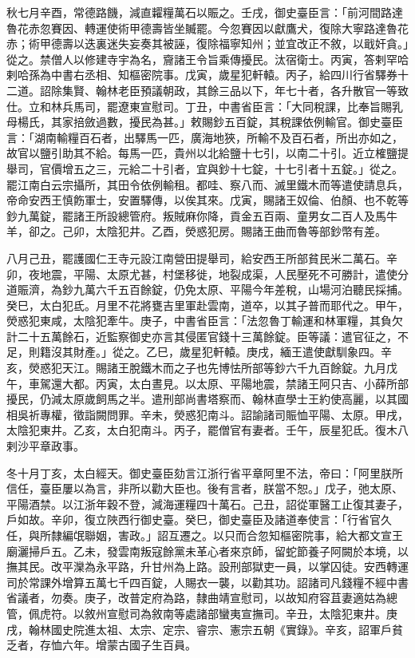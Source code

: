 \begin{pinyinscope}
 秋七月辛酉，常德路饑，減直糶糧萬石以賑之。壬戌，御史臺臣言：「前河間路達魯花赤忽賽因、轉運使術甲德壽皆坐贓罷。今忽賽因以獻鷹犬，復除大寧路達魯花赤；術甲德壽以迭裏迷失妄奏其被誣，復除福寧知州；並宜改正不敘，以戢奸貪。」從之。禁僧人以修建寺宇為名，齎諸王令旨乘傳擾民。汰宿衛士。丙寅，答剌罕哈剌哈孫為中書右丞相、知樞密院事。戊寅，歲星犯軒轅。丙子，給四川行省驛券十二道。詔除集賢、翰林老臣預議朝政，其餘三品以下，年七十者，各升散官一等致仕。立和林兵馬司，罷遼東宣慰司。丁丑，中書省臣言：「大同稅課，比奉旨賜乳母楊氏，其家掊斂過數，擾民為甚。」敕賜鈔五百錠，其稅課依例輸官。御史臺臣言：「湖南輸糧百石者，出驛馬一匹，廣海地狹，所輸不及百石者，所出亦如之，故官以鹽引助其不給。每馬一匹，貴州以北給鹽十七引，以南二十引。近立榷鹽提舉司，官價增五之三，元給二十引者，宜與鈔十七錠，十七引者十五錠。」從之。罷江南白云宗攝所，其田令依例輸租。都哇、察八而、滅里鐵木而等遣使請息兵，帝命安西王慎飭軍士，安置驛傳，以俟其來。戊寅，賜諸王奴倫、伯顏、也不乾等鈔九萬錠，罷諸王所設總管府。叛賊麻你降，貢金五百兩、童男女二百人及馬牛羊，卻之。己卯，太陰犯井。乙酉，熒惑犯房。賜諸王曲而魯等部鈔幣有差。



 八月己丑，罷護國仁王寺元設江南營田提舉司，給安西王所部貧民米二萬石。辛卯，夜地震，平陽、太原尤甚，村堡移徙，地裂成渠，人民壓死不可勝計，遣使分道賑濟，為鈔九萬六千五百餘錠，仍免太原、平陽今年差稅，山場河泊聽民採捕。癸巳，太白犯氐。月里不花將甕吉里軍赴雲南，道卒，以其子普而耶代之。甲午，熒惑犯東咸，太陰犯牽牛。庚子，中書省臣言：「法忽魯丁輸運和林軍糧，其負欠計二十五萬餘石，近監察御史亦言其侵匿官錢十三萬餘錠。臣等議：遣官征之，不足，則籍沒其財產。」從之。乙巳，歲星犯軒轅。庚戌，緬王遣使獻馴象四。辛亥，熒惑犯天江。賜諸王脫鐵木而之子也先博怯所部等鈔六千九百餘錠。九月戊午，車駕還大都。丙寅，太白晝見。以太原、平陽地震，禁諸王阿只吉、小薛所部擾民，仍減太原歲飼馬之半。遣刑部尚書塔察而、翰林直學士王約使高麗，以其國相吳祈專權，徵詣闕問罪。辛未，熒惑犯南斗。詔諭諸司賑恤平陽、太原。甲戌，太陰犯東井。乙亥，太白犯南斗。丙子，罷僧官有妻者。壬午，辰星犯氐。復木八剌沙平章政事。



 冬十月丁亥，太白經天。御史臺臣劾言江浙行省平章阿里不法，帝曰：「阿里朕所信任，臺臣屢以為言，非所以勸大臣也。後有言者，朕當不恕。」戊子，弛太原、平陽酒禁。以江浙年穀不登，減海運糧四十萬石。己丑，詔從軍醫工止復其妻子，戶如故。辛卯，復立陜西行御史臺。癸巳，御史臺臣及諸道奉使言：「行省官久任，與所隸編氓聯姻，害政。」詔互遷之。以只而合忽知樞密院事，給大都文宣王廟灑掃戶五。乙未，發雲南叛寇餘黨未革心者來京師，留蛇節養子阿闕於本境，以撫其民。改平灤為永平路，升甘州為上路。設刑部獄吏一員，以掌囚徒。安西轉運司於常課外增算五萬七千四百錠，人賜衣一襲，以勸其功。詔諸司凡錢糧不經中書省議者，勿奏。庚子，改普定府為路，隸曲靖宣慰司，以故知府容苴妻適姑為總管，佩虎符。以敘州宣慰司為敘南等處諸部蠻夷宣撫司。辛丑，太陰犯東井。庚戌，翰林國史院進太祖、太宗、定宗、睿宗、憲宗五朝《實錄》。辛亥，詔軍戶貧乏者，存恤六年。增蒙古國子生百員。




\end{pinyinscope}

